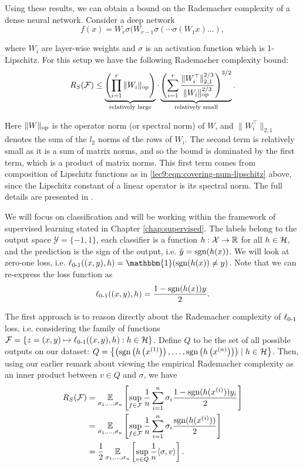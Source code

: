 Using these results, we can obtain a bound on the Rademacher complexity of a dense neural network. Consider a deep network
\begin{equation}
f(x) = W_r\sigma(W_{r-1}\sigma(\cdots \sigma(W_1x)\ldots),
\end{equation}

where $W_i$ are layer-wise weights and $\sigma$ is an activation function which is 1-Lipschitz. For this setup we have the following Rademacher complexity bound:
\begin{equation}
R_S (\mathcal F) \leq \underbrace{\left(\prod_{i=1}^r\|W_i\|_{\textup{op}} \right)}_{\text{relatively large}} \cdot \underbrace{\left( \sum_{i=1}^r\frac{\|W_i^\top\|^{2/3}_{2,1}}{\|W_i\|_{\textup{op}}^{2/3}}\right)^{3/2}}_{\text{relatively small}}.
\end{equation}
        
Here $\|W\|_{\textup{op}}$ is the operator norm (or spectral norm) of $W$, and $\|W_i^\top\|_{2,1}$ denotes the sum of the $l_2$ norms of the rows of $W_i$. The second term is relatively small as it is a sum of matrix norms, and so the bound is dominated by the first term, which is a product of matrix norms. This first term comes from composition of Lipschitz functions as in \eqref{lec9:eqn:covering-num-lipschitz} above, since the Lipschitz constant of a linear operator is its spectral norm. The full details are presented in \cite{bartlett2017}.


We will focus on classification and will be working within the framework of supervised learning stated in Chapter \ref{chap:supervised}. The labels belong to the output space $\mathcal{Y} = \{-1, 1\}$, each classifier is a function $h:\mathcal{X}\to\mathbb R$ for all $h \in \mathcal H$, and the prediction is the sign of the output, i.e. $\hat{y} = \text{sgn}(h(x))$. We will look at zero-one loss, i.e. $\err((x,y), h) = \mathbbm{1}(\sgn(h(x))\neq y)$. Note that we can re-express the loss function as
\begin{equation}
\ell_{\textup{0-1}}((x,y), h) = \frac{1-\text{sgn}(h(x))y}{2}.
\end{equation}

The first approach is to reason directly about the Rademacher complexity of $\ell_{\textup{0-1}}$ loss, i.e. considering the family of functions $\mathcal F = \left\{ z = (x, y) \mapsto \ell_{\textup{0-1}}((x, y), h) : h \in \mathcal H \right\}$. Define $Q$ to be the set of all possible outputs on our dataset: $Q=\left\{\left(\text{sgn}\left(h\left(x^{(1)}\right)\right), \dots, \text{sgn} \left(h\left(x^{(n)}\right)\right)\right)\mid  h \in \mathcal H \right\}$. Then, using our earlier remark about viewing the empirical Rademacher complexity as an inner product between $v\in Q$ and $\sigma$, we have
\begin{align}
R_S(\mathcal F) &= \operatorname*{\mathbb{E}}_{\sigma_1,\dots, \sigma_n} \left[ \sup_{f\in \mathcal F} \frac{1}{n} \sum^n_{i=1} \sigma_i \frac{1-\text{sgn}(h(x^{(i)}))y_i}{2} \right] \\
&= \operatorname*{\mathbb{E}}_{\sigma_1,\dots, \sigma_n} \left[ \sup_{f\in \mathcal F} \frac{1}{n} \sum^n_{i=1} \sigma_i \frac{\text{sgn}(h(x^{(i)}))}{2} \right] \\
&= \frac{1}{2}\operatorname*{\mathbb{E}}_{\sigma_1,\dots, \sigma_n} \left[ \sup_{v\in Q} \frac{1}{n} \langle \sigma, v\rangle \right].
\end{align}

